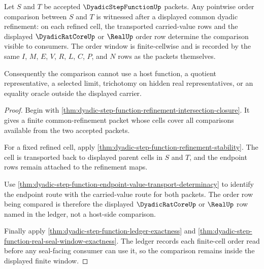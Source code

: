\begin{theorem}
\label{thm:dyadic-step-function-stepwise-order-window}
Let $S$ and $T$ be accepted $\DyadicStepFunctionUp$ packets. Any pointwise order comparison between $S$ and $T$ is witnessed after a displayed common dyadic refinement: on each refined cell, the transported carried-value rows and the displayed $\DyadicRatCoreUp$ or $\RealUp$ order row determine the comparison visible to consumers. The order window is finite-cellwise and is recorded by the same $I$, $M$, $E$, $V$, $R$, $L$, $C$, $P$, and $N$ rows as the packets themselves.

Consequently the comparison cannot use a host function, a quotient representative, a selected limit, trichotomy on hidden real representatives, or an equality oracle outside the displayed carrier.
\end{theorem}
\begin{proof}
Begin with \autoref{thm:dyadic-step-function-refinement-intersection-closure}. It gives a finite common-refinement packet whose cells cover all comparisons available from the two accepted packets.

For a fixed refined cell, apply \autoref{thm:dyadic-step-function-refinement-stability}. The cell is transported back to displayed parent cells in $S$ and $T$, and the endpoint rows remain attached to the refinement maps.

Use \autoref{thm:dyadic-step-function-endpoint-value-transport-determinacy} to identify the endpoint route with the carried-value route for both packets. The order row being compared is therefore the displayed $\DyadicRatCoreUp$ or $\RealUp$ row named in the ledger, not a host-side comparison.

Finally apply \autoref{thm:dyadic-step-function-ledger-exactness} and \autoref{thm:dyadic-step-function-real-seal-window-exactness}. The ledger records each finite-cell order read before any seal-facing consumer can use it, so the comparison remains inside the displayed finite window.
\end{proof}

